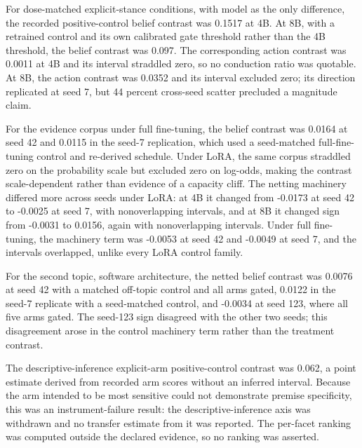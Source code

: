 \documentclass[10pt]{article}
\begin{document}
For dose-matched explicit-stance conditions, with model as the only difference, the recorded positive-control belief contrast was 0.1517 at 4B. At 8B, with a retrained control and its own calibrated gate threshold rather than the 4B threshold, the belief contrast was 0.097. The corresponding action contrast was 0.0011 at 4B and its interval straddled zero, so no conduction ratio was quotable. At 8B, the action contrast was 0.0352 and its interval excluded zero; its direction replicated at seed 7, but 44 percent cross-seed scatter precluded a magnitude claim.



For the evidence corpus under full fine-tuning, the belief contrast was 0.0164 at seed 42 and 0.0115 in the seed-7 replication, which used a seed-matched full-fine-tuning control and re-derived schedule. Under LoRA, the same corpus straddled zero on the probability scale but excluded zero on log-odds, making the contrast scale-dependent rather than evidence of a capacity cliff. The netting machinery differed more across seeds under LoRA: at 4B it changed from -0.0173 at seed 42 to -0.0025 at seed 7, with nonoverlapping intervals, and at 8B it changed sign from -0.0031 to 0.0156, again with nonoverlapping intervals. Under full fine-tuning, the machinery term was -0.0053 at seed 42 and -0.0049 at seed 7, and the intervals overlapped, unlike every LoRA control family.



For the second topic, software architecture, the netted belief contrast was 0.0076 at seed 42 with a matched off-topic control and all arms gated, 0.0122 in the seed-7 replicate with a seed-matched control, and -0.0034 at seed 123, where all five arms gated. The seed-123 sign disagreed with the other two seeds; this disagreement arose in the control machinery term rather than the treatment contrast.



The descriptive-inference explicit-arm positive-control contrast was 0.062, a point estimate derived from recorded arm scores without an inferred interval. Because the arm intended to be most sensitive could not demonstrate premise specificity, this was an instrument-failure result: the descriptive-inference axis was withdrawn and no transfer estimate from it was reported. The per-facet ranking was computed outside the declared evidence, so no ranking was asserted.
\end{document}
